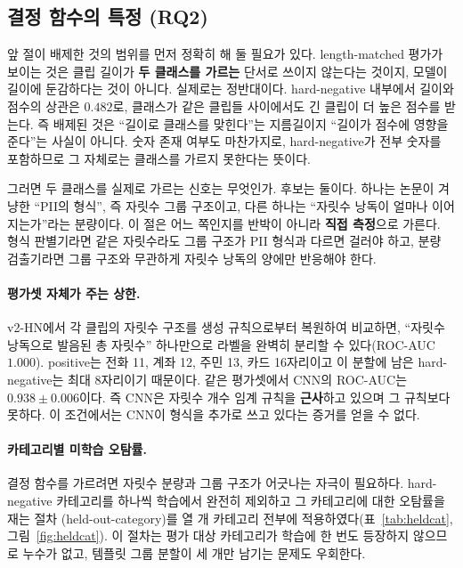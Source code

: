 \documentclass[11pt]{article}
\renewcommand{\emph}[1]{\textbf{#1}}
\begin{document}
\subsection{결정 함수의 특정 (RQ2)}\label{sec:exp:decision}
앞 절이 배제한 것의 범위를 먼저 정확히 해 둘 필요가 있다. length-matched 평가가 보이는 것은
클립 길이가 \emph{두 클래스를 가르는} 단서로 쓰이지 않는다는 것이지, 모델이 길이에 둔감하다는
것이 아니다. 실제로는 정반대이다. hard-negative 내부에서 길이와 점수의 상관은 $0.482$로,
클래스가 같은 클립들 사이에서도 긴 클립이 더 높은 점수를 받는다. 즉 배제된 것은
``길이로 클래스를 맞힌다''는
지름길이지 ``길이가 점수에 영향을 준다''는 사실이 아니다. 숫자 존재 여부도 마찬가지로,
hard-negative가 전부 숫자를 포함하므로 그 자체로는 클래스를 가르지 못한다는 뜻이다.

그러면 두 클래스를 실제로 가르는 신호는 무엇인가. 후보는 둘이다. 하나는 논문이 겨냥한 ``PII의
형식'', 즉 자릿수 그룹 구조이고, 다른 하나는 ``자릿수 낭독이 얼마나 이어지는가''라는 분량이다.
이 절은 어느 쪽인지를 반박이 아니라 \emph{직접 측정}으로 가른다. 형식 판별기라면 같은 자릿수라도
그룹 구조가 PII 형식과 다르면 걸러야 하고, 분량 검출기라면 그룹 구조와 무관하게 자릿수 낭독의
양에만 반응해야 한다.

\paragraph{평가셋 자체가 주는 상한.}
v2-HN에서 각 클립의 자릿수 구조를 생성 규칙으로부터 복원하여 비교하면, ``자릿수 낭독으로
발음된 총 자릿수'' 하나만으로 라벨을 완벽히 분리할 수 있다(ROC-AUC $1.000$). positive는
전화 11, 계좌 12, 주민 13, 카드 16자리이고 이 분할에 남은 hard-negative는 최대 8자리이기
때문이다. 같은 평가셋에서 CNN의 ROC-AUC는 $0.938\pm0.006$이다. 즉 CNN은 자릿수 개수 임계
규칙을 \emph{근사}하고 있으며 그 규칙보다 못하다. 이 조건에서는 CNN이 형식을 추가로 쓰고
있다는 증거를 얻을 수 없다.

\paragraph{카테고리별 미학습 오탐률.}
결정 함수를 가르려면 자릿수 분량과 그룹 구조가 어긋나는 자극이 필요하다. hard-negative
카테고리를 하나씩 학습에서 완전히 제외하고 그 카테고리에 대한 오탐률을 재는 절차
(held-out-category)를 열 개 카테고리 전부에 적용하였다(표~\ref{tab:heldcat},
그림~\ref{fig:heldcat}). 이 절차는 평가 대상 카테고리가 학습에 한 번도 등장하지 않으므로
누수가 없고, 템플릿 그룹 분할이 세 개만 남기는 문제도 우회한다.
\end{document}
